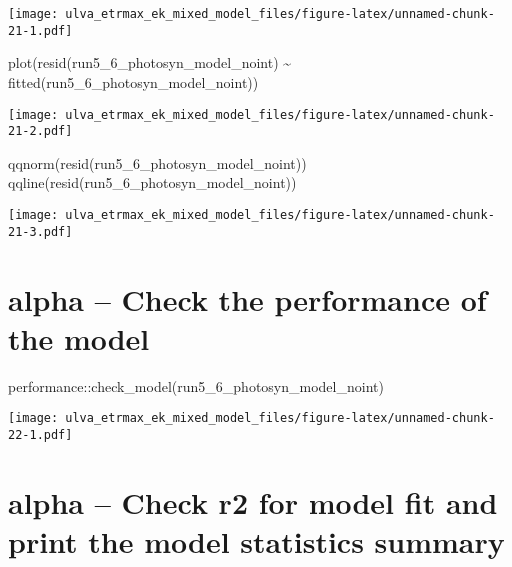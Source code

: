 \documentclass[
]{article}
\newenvironment{Shaded}{\begin{snugshade}}{\end{snugshade}}
\newcommand{\FunctionTok}[1]{\textcolor[rgb]{0.00,0.00,0.00}{#1}}
\newcommand{\NormalTok}[1]{#1}
\newcommand{\SpecialCharTok}[1]{\textcolor[rgb]{0.00,0.00,0.00}{#1}}
\begin{document}
\texttt{[image: ulva\_etrmax\_ek\_mixed\_model\_files/figure-latex/unnamed-chunk-21-1.pdf]}

\begin{Shaded}
\begin{Highlighting}[]
\FunctionTok{plot}\NormalTok{(}\FunctionTok{resid}\NormalTok{(run5\_6\_photosyn\_model\_noint) }\SpecialCharTok{\textasciitilde{}} \FunctionTok{fitted}\NormalTok{(run5\_6\_photosyn\_model\_noint))}
\end{Highlighting}
\end{Shaded}

\texttt{[image: ulva\_etrmax\_ek\_mixed\_model\_files/figure-latex/unnamed-chunk-21-2.pdf]}

\begin{Shaded}
\begin{Highlighting}[]
\FunctionTok{qqnorm}\NormalTok{(}\FunctionTok{resid}\NormalTok{(run5\_6\_photosyn\_model\_noint))}
\FunctionTok{qqline}\NormalTok{(}\FunctionTok{resid}\NormalTok{(run5\_6\_photosyn\_model\_noint))}
\end{Highlighting}
\end{Shaded}

\texttt{[image: ulva\_etrmax\_ek\_mixed\_model\_files/figure-latex/unnamed-chunk-21-3.pdf]}

\hypertarget{alpha-check-the-performance-of-the-model}{%
\section{alpha -- Check the performance of the
model}\label{alpha-check-the-performance-of-the-model}}

\begin{Shaded}
\begin{Highlighting}[]
\NormalTok{performance}\SpecialCharTok{::}\FunctionTok{check\_model}\NormalTok{(run5\_6\_photosyn\_model\_noint)}
\end{Highlighting}
\end{Shaded}

\texttt{[image: ulva\_etrmax\_ek\_mixed\_model\_files/figure-latex/unnamed-chunk-22-1.pdf]}

\hypertarget{alpha-check-r2-for-model-fit-and-print-the-model-statistics-summary}{%
\section{alpha -- Check r2 for model fit and print the model statistics
summary}\label{alpha-check-r2-for-model-fit-and-print-the-model-statistics-summary}}
\end{document}
